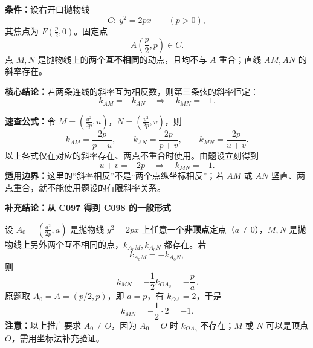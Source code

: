 \begin{statementbox}
\textbf{条件：}设右开口抛物线
\[
 C:\ y^2=2px\qquad(p>0),
\]
其焦点为 $F\left(\frac p2,0\right)$。固定点
\[
 \boxed{A\left(\frac p2,p\right)}\in C.
\]
点 $M,N$ 是抛物线上的两个\textbf{互不相同}的动点，且均不与 $A$ 重合；直线 $AM,AN$ 的斜率存在。

\begin{center}
 
\end{center}

\textbf{核心结论：}若两条连线的斜率互为相反数，则第三条弦的斜率恒定：
\[
 \boxed{k_{AM}=-k_{AN}\quad\Longrightarrow\quad k_{MN}=-1.}
\]
\end{statementbox}
\clearpage
\begin{statementbox}
\textbf{速查公式：}令 $M=(\frac{u^2}{2p},u)$，$N=(\frac{v^2}{2p},v)$，则
\[
 \boxed{k_{AM}=\frac{2p}{p+u}},\qquad
 \boxed{k_{AN}=\frac{2p}{p+v}},\qquad
 \boxed{k_{MN}=\frac{2p}{u+v}}.
\]
以上各式仅在对应的斜率存在、两点不重合时使用。由题设立刻得到
\[
 \boxed{u+v=-2p}\quad\Longrightarrow\quad\boxed{k_{MN}=-1}.
\]
\textbf{适用边界：}这里的“斜率相反”不是“两个点纵坐标相反”；若 $AM$ 或 $AN$ 竖直、两点重合，就不能使用题设的有限斜率关系。
\end{statementbox}


\clearpage
\begin{statementbox}
\textbf{补充结论：从 C097 得到 C098 的一般形式}

设 $A_0=\left(\frac{a^2}{2p},a\right)$ 是抛物线 $y^2=2px$ 上任意一个\textbf{非顶点}定点（$a\ne0$），$M,N$ 是抛物线上另外两个互不相同的点，$k_{A_0M},k_{A_0N}$ 都存在。若
\[
 k_{A_0M}=-k_{A_0N},
\]
则
\[
 \boxed{\,k_{MN}=-\frac12k_{OA_0}=-\frac pa\,}.
\]
原题取 $A_0=A=(p/2,p)$，即 $a=p$，有 $k_{OA}=2$，于是
\[
 \boxed{k_{MN}=-\frac12\cdot2=-1}.
\]
\textbf{注意：}以上推广要求 $A_0\ne O$，因为 $A_0=O$ 时 $k_{OA_0}$ 不存在；$M$ 或 $N$ 可以是顶点 $O$，需用坐标法补充验证。
\end{statementbox}
